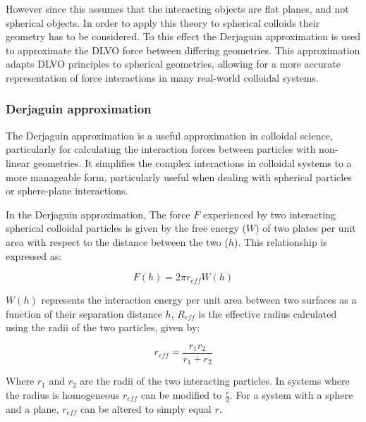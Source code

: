 However since this assumes that the interacting objects are flat planes, and not spherical objects. In order to apply this theory to spherical colloids their geometry has to be considered. To this effect the Derjaguin approximation is used to approximate the DLVO force between differing geometries. This approximation adapts DLVO principles to spherical geometries, allowing for a more accurate representation of force interactions in many real-world colloidal systems. 

\subsubsection{Derjaguin approximation}

The Derjaguin approximation is a useful approximation in colloidal science, particularly for calculating the interaction forces between particles with non-linear geometries. It simplifies the complex interactions in colloidal systems to a more manageable form, particularly useful when dealing with spherical particles or sphere-plane interactions.

In the Derjaguin approximation, The force $F$ experienced by two interacting spherical colloidal particles is given by the free energy ($W$) of two plates per unit area with respect to the distance between the two ($h$). This relationship is expressed as:

\begin{equation} %
F(h) = 2 \pi r_{eff} W(h)
\end{equation}

$W(h)$ represents the interaction energy per unit area between two surfaces as a function of their separation distance $h$, $R_{eff}$ is the effective radius calculated using the radii of the two particles, given by:

\begin{equation} %
r_{eff} = \frac{r_1r_2}{r_1 + r_2}
\end{equation}

Where $r_1$ and $r_2$ are the radii of the two interacting particles. In systems where the radius is homogeneous $r_{eff}$ can be modified to $\frac{r}{2}$. For a system with a sphere and a plane, $r_{eff}$ can be altered to simply equal $r$.

